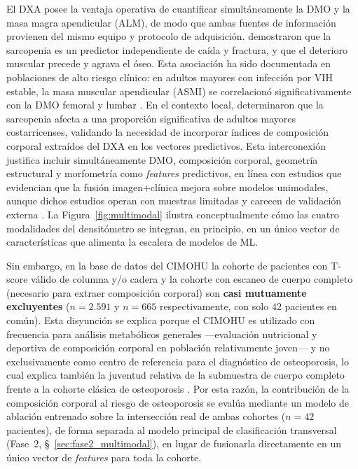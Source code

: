 \documentclass[../tesis.tex]{subfiles}
\begin{document}
El DXA posee la ventaja operativa de cuantificar simultáneamente la DMO y la masa magra
apendicular (ALM), de modo que ambas fuentes de información provienen del mismo equipo
y protocolo de adquisición.
\textcite{Kirk2020} demostraron que la sarcopenia es un predictor independiente de caída y
fractura, y que el deterioro muscular precede y agrava el óseo.
Esta asociación ha sido documentada en poblaciones de alto riesgo clínico: en adultos mayores
con infección por VIH estable, la masa muscular apendicular (ASMI) se correlacionó
significativamente con la DMO femoral y lumbar \parencite{Oursler2020}.
En el contexto local, \textcite{Barrientos2021} determinaron que la sarcopenia afecta a una
proporción significativa de adultos mayores costarricenses, validando la necesidad de incorporar
índices de composición corporal extraídos del DXA en los vectores predictivos.
Esta interconexión justifica incluir simultáneamente DMO, composición corporal, geometría
estructural y morfometría como \textit{features} predictivos, en línea con estudios que evidencian
que la fusión imagen+clínica mejora sobre modelos unimodales, aunque dichos estudios operan con
muestras limitadas y carecen de validación externa \parencite{Ong2023, Wu2025multimodal, Conforti2026}.
La Figura~\ref{fig:multimodal} ilustra conceptualmente cómo las cuatro modalidades del densitómetro
se integran, en principio, en un único vector de características que alimenta la escalera de
modelos de ML.

Sin embargo, en la base de datos del CIMOHU la cohorte de pacientes con T-score válido de columna
y/o cadera y la cohorte con escaneo de cuerpo completo (necesario para extraer composición
corporal) son \textbf{casi mutuamente excluyentes} ($n = 2.591$ y $n = 665$ respectivamente, con
solo 42 pacientes en común). Esta disyunción se explica porque el CIMOHU es utilizado con
frecuencia para análisis metabólicos generales ---evaluación nutricional y deportiva de
composición corporal en población relativamente joven--- y no exclusivamente como centro de
referencia para el diagnóstico de osteoporosis, lo cual explica también la juventud relativa de la
submuestra de cuerpo completo frente a la cohorte clásica de osteoporosis \parencite{Barrientos2021}.
Por esta razón, la contribución de la composición corporal al riesgo de osteoporosis se evalúa
mediante un modelo de ablación entrenado sobre la intersección real de ambas cohortes ($n = 42$
pacientes), de forma separada al modelo principal de clasificación transversal (Fase~2,
§~\ref{sec:fase2_multimodal}), en lugar de fusionarla directamente en un único vector de
\textit{features} para toda la cohorte.
\end{document}
